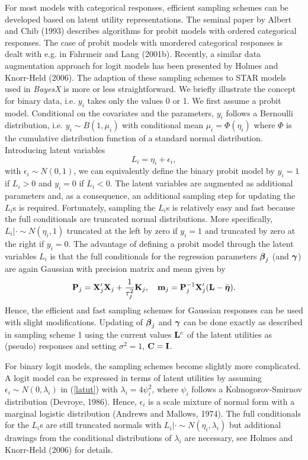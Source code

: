 \documentclass[11pt,a4paper,twoside]{bayesxarticle}
\begin{document}
For most models with categorical responses, efficient sampling
schemes can be developed based on latent utility representations.
The seminal paper by Albert and Chib (1993) describes algorithms for
probit models with ordered categorical responses. The case of probit
models with unordered categorical responses is dealt with e.g. in
Fahrmeir and Lang (2001b). Recently, a similar data augmentation
approach for logit models has been presented by Holmes and
Knorr-Held (2006). The adaption of these sampling schemes to STAR
models used in {\em BayesX} is more or less straightforward. We
briefly illustrate the concept for binary data, i.e. $y_i$ takes
only the values 0 or 1. We first assume a probit model. Conditional
on the covariates and the parameters, $y_i$ follows a Bernoulli
distribution, i.e. $y_i \sim B(1,\mu_i)$ with conditional mean
$\mu_i = \Phi(\eta_i)$ where $\Phi$ is the cumulative distribution
function of a standard normal distribution. Introducing latent
variables
\begin{equation}
\label{latut} L_i = \eta_i + \epsilon_i,
\end{equation}
with $\epsilon_i \sim N(0,1)$, we can equivalently define the binary
probit model by $y_i = 1$ if $L_i > 0$ and $y_i=0$ if $L_i < 0$. The
latent variables are augmented as additional parameters and, as a
consequence, an additional sampling step for updating the $L_i$s is
required. Fortunately, sampling the $L_i$s is relatively easy and
fast because the full conditionals are truncated normal
distributions. More specifically, $L_i | \cdot \sim N(\eta_i,1)$
truncated at the left by zero if $y_i=1$ and truncated by zero at
the right if $y_i=0$. The advantage of defining a probit model
through the latent variables $L_i$ is that the full conditionals for
the regression parameters $\boldsymbol{\beta}_j$ (and $\boldsymbol{\gamma}$) are again
Gaussian with precision matrix and mean given by
\begin{equation}
\label{prec2} \Pvec_j = \Xvec_j'\Xvec_j + \frac{1}{\tau^2_j}\Kvec_j, \quad \mvec_j =
\Pvec_j^{-1} \Xvec_j'(\Lvec-\tilde{\etavec}).
\end{equation}
Hence, the efficient and fast sampling schemes for Gaussian
responses can be used with slight modifications. Updating of
$\boldsymbol{\beta}_j$ and $\boldsymbol{\gamma}$ can be done exactly as described in
sampling scheme 1  using the current values $\mathbf{L}^c$ of the latent
utilities as (pseudo) responses and setting $\sigma^2=1$, $\mathbf{C}=\mathbf{I}$.

For binary logit models, the sampling schemes become slightly more
complicated. A logit model can be expressed in terms of latent
utilities by assuming $\epsilon_i \sim N(0,\lambda_i)$ in
(\ref{latut}) with $\lambda_i = 4\psi_i^2$, where $\psi_i$ follows a
Kolmogorov-Smirnov distribution (Devroye, 1986). Hence, $\epsilon_i$
is  a scale mixture of normal form with a marginal logistic
distribution (Andrews and Mallows, 1974). The full conditionals for
the $L_i$s are still truncated normals with $L_i | \cdot \sim
N(\eta_i,\lambda_i)$ but additional drawings from the conditional
distributions of $\lambda_i$ are necessary, see Holmes and
Knorr-Held (2006) for details.
\end{document}

